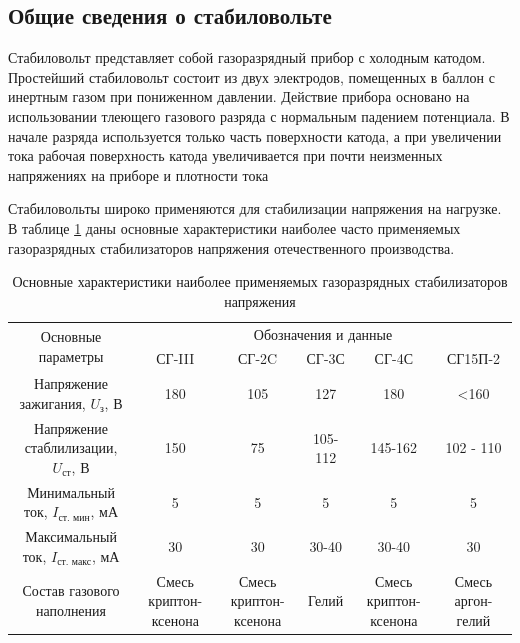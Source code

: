 \documentclass[a4paper, 12pt]{article}
\begin{document}
	\subsection{Общие сведения о стабиловольте}
	Стабиловольт представляет собой газоразрядный прибор с холодным катодом. Простейший стабиловольт состоит из двух электродов, помещенных в баллон с инертным газом при пониженном давлении. Действие прибора основано на использовании тлеющего газового разряда с нормальным падением потенциала. В начале разряда используется только часть поверхности катода, а при увеличении тока рабочая поверхность катода увеличивается при почти неизменных напряжениях на приборе и плотности тока\par
	Стабиловольты широко применяются для стабилизации напряжения на нагрузке. В таблице \ref{table:Table2} даны основные характеристики наиболее часто применяемых газоразрядных стабилизаторов напряжения отечественного производства.\par
	\begin{table}[h]
		\centering
		\begin{tabular}{|c|c|c|c|c|c|}
			\hline
			\multirow{2}{*}{Основные параметры} & \multicolumn{5}{|c|}{Обозначения и данные}\\
			\cline{2-6}
				& СГ-III & СГ-2C & СГ-3С & СГ-4С & СГ15П-2\\
			\hline
			\multicolumn{1}{|p{4cm}|}{Напряжение зажигания, $U_\text{з}$, В} & 180 & 105 & 127 & 180 & <160\\
			\hline
			\multicolumn{1}{|p{3cm}|}{Напряжение стаблилизации, $U_\text{ст}$, В} & 150 & 75 & 105-112 & 145-162 & 102 - 110\\
			\hline
			\multicolumn{1}{|p{3cm}|}{Минимальный ток, $I_\text{ст. мин}$, мА} & 5 & 5 & 5 & 5 & 5\\
			\hline
			\multicolumn{1}{|p{3cm}|}{Максимальный ток, $I_\text{ст. макс}$, мА} & 30 & 30 & 30-40 & 30-40 & 30\\
			\hline
			\multicolumn{1}{|p{3cm}|}{Состав газового наполнения} & \multicolumn{1}{|p{2cm}|}{Смесь криптон-ксенона} & \multicolumn{1}{|p{2cm}|}{Смесь криптон-ксенона} & Гелий & \multicolumn{1}{|p{2cm}|}{Смесь криптон-ксенона} & \multicolumn{1}{|p{2cm}|}{Смесь аргон-гелий}\\
			\hline
		\end{tabular}
		\caption{Основные характеристики наиболее применяемых газоразрядных стабилизаторов напряжения}
		\label{table:Table2}
	\end{table}
\end{document}
